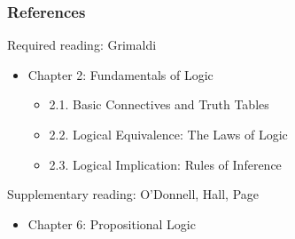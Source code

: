 \documentclass[dvipsnames]{beamer}
\begin{document}
\begin{frame}
  \frametitle{References}

  \begin{block}{Required reading: Grimaldi}
    \begin{itemize}
      \item Chapter 2: Fundamentals of Logic
      \begin{itemize}
        \item 2.1. \alert{Basic Connectives and Truth Tables}
        \item 2.2. \alert{Logical Equivalence: The Laws of Logic}\\
        \item 2.3. \alert{Logical Implication: Rules of Inference}
      \end{itemize}
    \end{itemize}
  \end{block}

  \begin{block}{Supplementary reading: O'Donnell, Hall, Page}
    \begin{itemize}
      \item Chapter 6: Propositional Logic
    \end{itemize}
  \end{block}
\end{frame}
\end{document}
